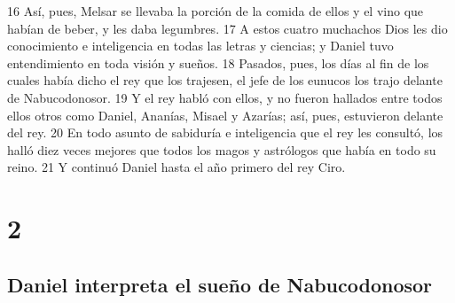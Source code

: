 16 Así, pues, Melsar se llevaba la porción de la comida de ellos y el vino que habían de beber, y les daba legumbres.
17 A estos cuatro muchachos Dios les dio conocimiento e inteligencia en todas las letras y ciencias; y Daniel tuvo entendimiento en toda visión y sueños. 
18 Pasados, pues, los días al fin de los cuales había dicho el rey que los trajesen, el jefe de los eunucos los trajo delante de Nabucodonosor.
19 Y el rey habló con ellos, y no fueron hallados entre todos ellos otros como Daniel, Ananías, Misael y Azarías; así, pues, estuvieron delante del rey.
20 En todo asunto de sabiduría e inteligencia que el rey les consultó, los halló diez veces mejores que todos los magos y astrólogos que había en todo su reino.
21 Y continuó Daniel hasta el año primero del rey Ciro.

\chapter{2}

\section*{Daniel interpreta el sueño de Nabucodonosor}

